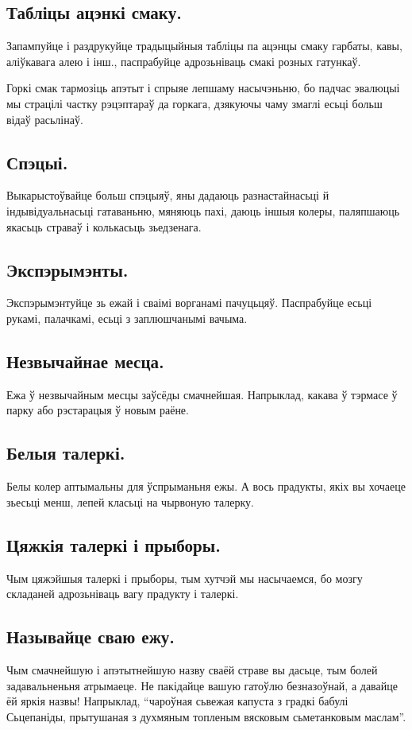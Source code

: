 \subsection{Табліцы ацэнкі смаку.}
Запампуйце і раздрукуйце традыцыйныя табліцы па ацэнцы смаку гарбаты, кавы, аліўкавага алею і інш., паспрабуйце адрозьніваць смакі розных гатункаў.

Горкі смак тармозіць апэтыт і спрыяе лепшаму насычэньню, бо падчас эвалюцыі мы страцілі частку рэцэптараў да горкага, дзякуючы чаму змаглі есьці больш відаў расьлінаў.

\subsection{Спэцыі.}
Выкарыстоўвайце больш спэцыяў, яны дадаюць разнастайнасьці й індывідуальнасьці гатаваньню, мяняюць пахі, даюць іншыя колеры, паляпшаюць якасьць страваў і колькасьць зьедзенага.

\subsection{Экспэрымэнты.}
Экспэрымэнтуйце зь ежай і сваімі ворганамі пачуцьцяў. Паспрабуйце есьці рукамі, палачкамі, есьці з заплюшчанымі вачыма.

\subsection{Незвычайнае месца.}
Ежа ў незвычайным месцы заўсёды смачнейшая. Напрыклад, какава ў тэрмасе ў парку або рэстарацыя ў новым раёне.

\subsection{Белыя талеркі.}
Белы колер аптымальны для ўспрыманьня ежы. А вось прадукты, якіх вы хочаеце зьесьці менш, лепей класьці на чырвоную талерку.

\subsection{Цяжкія талеркі і прыборы.}
Чым цяжэйшыя талеркі і прыборы, тым хутчэй мы насычаемся, бо мозгу складаней адрозьніваць вагу прадукту і талеркі.

\subsection{Называйце сваю ежу.}
Чым смачнейшую і апэтытнейшую назву сваёй страве вы дасьце, тым болей задавальненьня атрымаеце. Не пакідайце вашую гатоўлю безназоўнай, а давайце ёй яркія назвы! Напрыклад, “чароўная сьвежая капуста з градкі бабулі Сьцепаніды, прытушаная з духмяным топленым вясковым сьметанковым маслам”.

